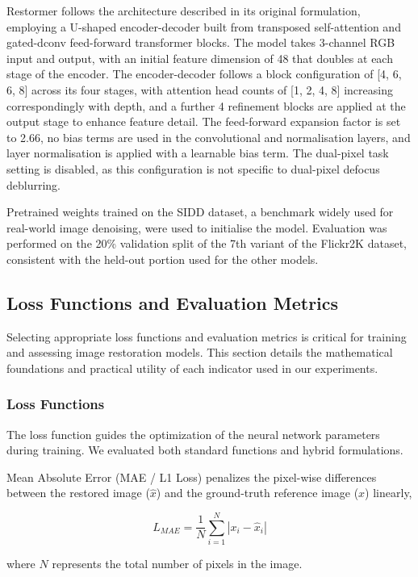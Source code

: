 \documentclass[conference]{IEEEtran}
\begin{document}
Restormer follows the architecture described in its original formulation,
employing a U-shaped encoder-decoder built from transposed self-attention and
gated-dconv feed-forward transformer blocks. The model takes 3-channel RGB
input and output, with an initial feature dimension of 48 that doubles at each
stage of the encoder. The encoder-decoder follows a block configuration of [4,
6, 6, 8] across its four stages, with attention head counts of [1, 2, 4, 8]
increasing correspondingly with depth, and a further 4 refinement blocks are
applied at the output stage to enhance feature detail. The feed-forward
expansion factor is set to 2.66, no bias terms are used in the convolutional
and normalisation layers, and layer normalisation is applied with a learnable
bias term. The dual-pixel task setting is disabled, as this configuration is
not specific to dual-pixel defocus deblurring.

Pretrained weights trained on the SIDD dataset, a benchmark widely used for
real-world image denoising, were used to initialise the model. Evaluation was
performed on the 20\% validation split of the 7th variant of the Flickr2K
dataset, consistent with the held-out portion used for the other models.

\subsection{Loss Functions and Evaluation Metrics}

Selecting appropriate loss functions and evaluation metrics is critical
for training and assessing image restoration models.
This section details the mathematical foundations and practical utility of each indicator used in our experiments.

\subsubsection{Loss Functions}

The loss function guides the optimization of the neural network parameters during training.
We evaluated both standard functions and hybrid formulations.

Mean Absolute Error (MAE / L1 Loss) penalizes the pixel-wise differences between the restored image ($\hat{x}$)
and the ground-truth reference image ($x$) linearly,

$$
L_{MAE} = \frac{1}{N} \sum_{i=1}^{N} |x_i - \hat{x}_i|
$$

where $N$ represents the total number of pixels in the image.
\end{document}
